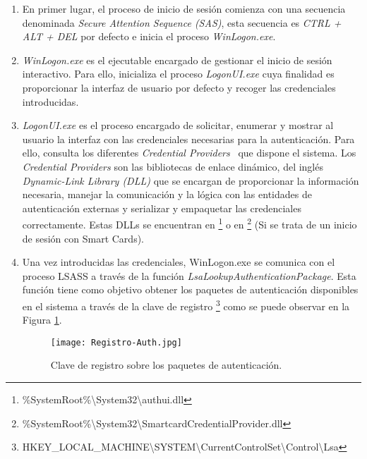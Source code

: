\begin{enumerate}
\item En primer lugar, el proceso de inicio de sesión comienza con una secuencia denominada {\it Secure Attention Sequence (SAS)}, esta secuencia es {\it CTRL + ALT + DEL} por defecto e inicia el proceso {\it WinLogon.exe}.

\item {\it WinLogon.exe} es el ejecutable encargado de gestionar el inicio de sesión interactivo. Para ello, inicializa el proceso {\it LogonUI.exe} cuya finalidad es proporcionar la interfaz de usuario por defecto y recoger las credenciales introducidas. 

\item {\it LogonUI.exe} es el proceso encargado de solicitar, enumerar y mostrar al usuario la interfaz con las credenciales necesarias para la autenticación. Para ello, consulta los diferentes {\it Credential Providers}~\cite{Capitulo2:CredentialProviders} que dispone el sistema. Los {\it Credential Providers} son las bibliotecas de enlace dinámico, del inglés {\it Dynamic-Link Library (DLL)} que se encargan de proporcionar la información necesaria, manejar la comunicación y la lógica con las entidades de autenticación externas y serializar y empaquetar las credenciales correctamente. Estas DLLs se encuentran en \footnote{\%SystemRoot\%\textbackslash{}System32\textbackslash{}authui.dll} o en \footnote{\%SystemRoot\%\textbackslash{}System32\textbackslash{}SmartcardCredentialProvider.dll} (Si se trata de un inicio de sesión con Smart Cards).

\item Una vez introducidas las credenciales, {WinLogon.exe} se comunica con el proceso LSASS a través de la función {\it LsaLookupAuthenticationPackage}. Esta función tiene como objetivo obtener los paquetes de autenticación disponibles en el sistema a través de la clave de registro \footnote{HKEY\_LOCAL\_MACHINE\textbackslash{}SYSTEM\textbackslash{}CurrentControlSet\textbackslash{}Control\textbackslash{}Lsa} como se puede observar en la Figura \ref{Registro-Auth}.

\begin{figure}[t!] %
\begin{center}
\texttt{[image: Registro-Auth.jpg]}
\end{center}
\caption{Clave de registro sobre los paquetes de autenticación.}
\label{Registro-Auth}
\end{figure}


\end{enumerate}
